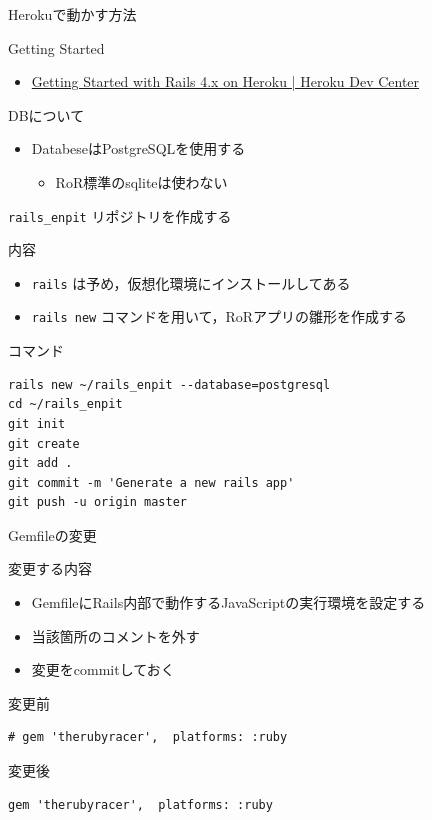 \documentclass[t, aspectratio=169]{beamer}
\begin{document}
\begin{frame}[label=sec-6-1-2]{Herokuで動かす方法}
\begin{block}{Getting Started}
\begin{itemize}
\item \href{https://devcenter.heroku.com/articles/getting-started-with-rails4}{Getting Started with Rails 4.x on Heroku | Heroku Dev Center}
\end{itemize}
\end{block}

\begin{block}{DBについて}
\begin{itemize}
\item DatabeseはPostgreSQLを使用する
\begin{itemize}
\item RoR標準のsqliteは使わない
\end{itemize}
\end{itemize}
\end{block}
\end{frame}
\begin{frame}[fragile,label=sec-6-1-3]{\texttt{rails\_enpit} リポジトリを作成する}
 \begin{block}{内容}
\begin{itemize}
\item \texttt{rails} は予め，仮想化環境にインストールしてある
\item \texttt{rails new} コマンドを用いて，RoRアプリの雛形を作成する
\end{itemize}
\end{block}
\begin{block}{コマンド}
\begin{verbatim}
rails new ~/rails_enpit --database=postgresql
cd ~/rails_enpit
git init
git create
git add .
git commit -m 'Generate a new rails app'
git push -u origin master
\end{verbatim}
\end{block}
\end{frame}

\begin{frame}[fragile,label=sec-6-1-4]{Gemfileの変更}
 \begin{block}{変更する内容}
\begin{itemize}
\item GemfileにRails内部で動作するJavaScriptの実行環境を設定する
\item 当該箇所のコメントを外す
\item 変更をcommitしておく
\end{itemize}
\end{block}
\begin{block}{変更前}
\begin{verbatim}
# gem 'therubyracer',  platforms: :ruby
\end{verbatim}
\end{block}

\begin{block}{変更後}
\begin{verbatim}
gem 'therubyracer',  platforms: :ruby
\end{verbatim}
\end{block}
\end{frame}
\end{document}
